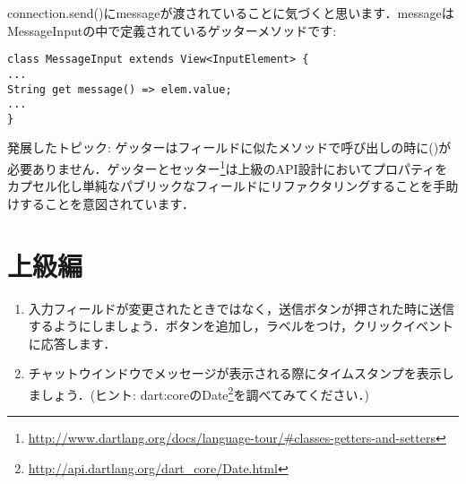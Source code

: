 connection.send()にmessageが渡されていることに気づくと思います．messageはMessageInputの中で定義されているゲッターメソッドです:

\begin{verbatim}
class MessageInput extends View<InputElement> {
...
String get message() => elem.value;
...
}
\end{verbatim}

発展したトピック: ゲッターはフィールドに似たメソッドで呼び出しの時に()が必要ありません．ゲッターとセッター\footnote{\url{http://www.dartlang.org/docs/language-tour/#classes-getters-and-setters}}は上級のAPI設計においてプロパティをカプセル化し単純なパブリックなフィールドにリファクタリングすることを手助けすることを意図されています．

\section{上級編}

\begin{enumerate}
\item 入力フィールドが変更されたときではなく，送信ボタンが押された時に送信するようにしましょう．ボタンを追加し，ラベルをつけ，クリックイベントに応答します．
\item チャットウインドウでメッセージが表示される際にタイムスタンプを表示しましょう．(ヒント: dart:coreのDate\footnote{\url{http://api.dartlang.org/dart_core/Date.html}}を調べてみてください．)
\end{enumerate}

